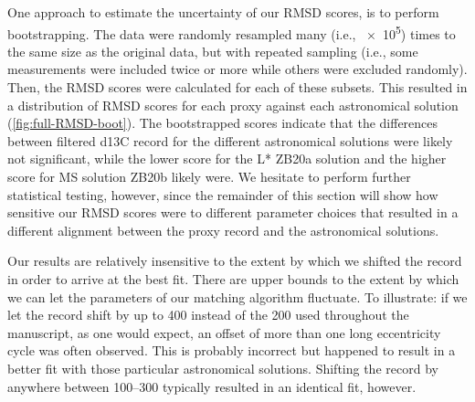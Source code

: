\documentclass[draft]{agujournal2019}
\begin{document}
One approach to estimate the uncertainty of our \gls{RMSD} scores, is to perform bootstrapping.
The data were randomly resampled many (i.e., \num{e5}) times to the same size as the original data, but with repeated sampling (i.e., some measurements were included twice or more while others were excluded randomly).
Then, the \gls{RMSD} scores were calculated for each of these subsets.
This resulted in a distribution of \gls{RMSD} scores for each proxy against each astronomical solution (\cref{fig:full-RMSD-boot}).
The bootstrapped scores indicate that the differences between filtered \gls{d13C} record for the different astronomical solutions were likely not significant,
while the lower score for the \gls{L*} ZB20a solution
and the higher score for \gls{MS} solution ZB20b
likely were.
We hesitate to perform further statistical testing, however, since the remainder of this section will show how sensitive our \gls{RMSD} scores were to different parameter choices that resulted in a different alignment between the proxy record and the astronomical solutions.

Our results are relatively insensitive to the extent by which we shifted the record in order to arrive at the best fit.
There are upper bounds to the extent by which we can let the parameters of our matching algorithm fluctuate.
To illustrate: if we let the record shift by up to \qty{400}{\kiloyear} instead of the \qty{200}{\kiloyear} used throughout the manuscript, as one would expect, an offset of more than one long eccentricity cycle was often observed.
This is probably incorrect but happened to result in a better fit with those particular astronomical solutions.
Shifting the record by anywhere between \qtyrange{100}{300}{\kiloyear} typically resulted in an identical fit, however.
\end{document}
